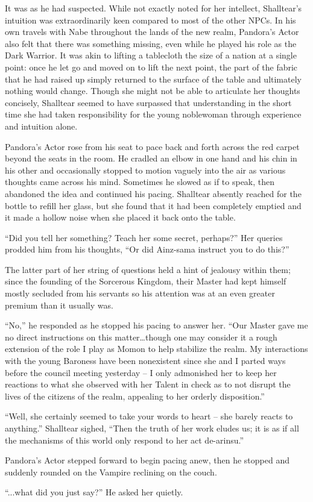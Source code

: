  

It was as he had suspected. While not exactly noted for her intellect, Shalltear’s intuition was extraordinarily keen compared to most of the other NPCs. In his own travels with Nabe throughout the lands of the new realm, Pandora’s Actor also felt that there was something missing, even while he played his role as the Dark Warrior. It was akin to lifting a tablecloth the size of a nation at a single point: once he let go and moved on to lift the next point, the part of the fabric that he had raised up simply returned to the surface of the table and ultimately nothing would change. Though she might not be able to articulate her thoughts concisely, Shalltear seemed to have surpassed that understanding in the short time she had taken responsibility for the young noblewoman through experience and intuition alone.

 

Pandora’s Actor rose from his seat to pace back and forth across the red carpet beyond the seats in the room. He cradled an elbow in one hand and his chin in his other and occasionally stopped to motion vaguely into the air as various thoughts came across his mind. Sometimes he slowed as if to speak, then abandoned the idea and continued his pacing. Shalltear absently reached for the bottle to refill her glass, but she found that it had been completely emptied and it made a hollow noise when she placed it back onto the table.

 

“Did you tell her something? Teach her some secret, perhaps?” Her queries prodded him from his thoughts, “Or did Ainz-sama instruct you to do this?”

 

The latter part of her string of questions held a hint of jealousy within them; since the founding of the Sorcerous Kingdom, their Master had kept himself mostly secluded from his servants so his attention was at an even greater premium than it usually was.

 

“No,” he responded as he stopped his pacing to answer her. “Our Master gave me no direct instructions on this matter…though one may consider it a rough extension of the role I play as Momon to help stabilize the realm. My interactions with the young Baroness have been nonexistent since she and I parted ways before the council meeting yesterday – I only admonished her to keep her reactions to what she observed with her Talent in check as to not disrupt the lives of the citizens of the realm, appealing to her orderly disposition.”

 

“Well, she certainly seemed to take your words to heart – she barely reacts to anything.” Shalltear sighed, “Then the truth of her work eludes us; it is as if all the mechanisms of this world only respond to her act de-arinsu.”

 

Pandora’s Actor stepped forward to begin pacing anew, then he stopped and suddenly rounded on the Vampire reclining on the couch.

 

“...what did you just say?” He asked her quietly.